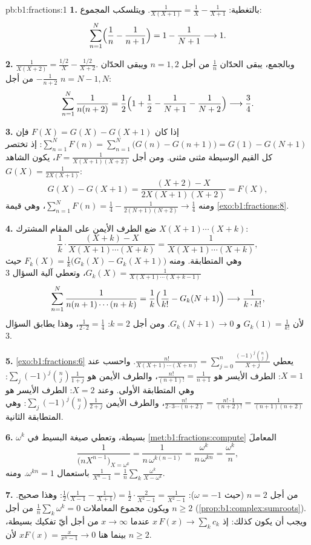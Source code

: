\begin{solution}{pb:b1:fractions:1}
\textbf{1.} بالتغطية: $\frac1{X(X+1)} = \frac1X - \frac1{X+1}$.
ويتلسكب المجموع:
\[
\sum_{n=1}^{N}\Bigl(\frac1n - \frac1{n+1}\Bigr)
= 1 - \frac1{N+1} \longrightarrow 1 .
\]

\textbf{2.} $\frac1{X(X+2)} = \frac{1/2}X - \frac{1/2}{X+2}$.
وبالجمع، يبقى الحدّان $\frac1n$ من أجل $n = 1, 2$ ويبقى الحدّان
$-\frac1{n+2}$ من أجل $n = N-1, N$:
\[
\sum_{n=1}^{N}\frac1{n(n+2)}
= \frac12\Bigl(1 + \frac12 - \frac1{N+1} - \frac1{N+2}\Bigr)
\longrightarrow \frac34 .
\]

\textbf{3.} إذا كان $F(X) = G(X) - G(X+1)$ فإن $\sum_{n=1}^N F(n) =
\sum_{n=1}^N\bigl(G(n) - G(n+1)\bigr) = G(1) - G(N+1)$: إذ تختصر
كل القيم الوسيطة مثنى مثنى. ومن أجل $F =
\frac1{X(X+1)(X+2)}$، يكون الشاهد $G(X) = \frac1{2X(X+1)}$:
\[
G(X) - G(X+1)
= \frac{(X+2) - X}{2X(X+1)(X+2)} = F(X) ,
\]
ومنه $\sum_{n=1}^N F(n) = \frac14 - \frac1{2(N+1)(N+2)} \to
\frac14$، وهي قيمة \cref{exo:b1:fractions:8}.

\textbf{4.} ضع الطرف الأيمن على المقام المشترك
$X(X+1)\cdots(X+k)$:
\[
\frac1k\cdot\frac{(X + k) - X}{X(X+1)\cdots(X+k)}
= \frac{1}{X(X+1)\cdots(X+k)} ,
\]
وهي المتطابقة. ومنه $F_k(X) = \frac1k\bigl(G_k(X) -
G_k(X+1)\bigr)$ حيث $G_k(X) = \frac1{X(X+1)\cdots(X+k-1)}$، وتعطي
آلية السؤال 3
\[
\sum_{n=1}^{N}\frac1{n(n+1)\cdots(n+k)}
= \frac1k\Bigl(\frac1{k!} - G_k(N+1)\Bigr)
\longrightarrow \frac1{k\cdot k!} ,
\]
لأن $G_k(1) = \frac1{k!}$ و $G_k(N+1) \to 0$. ومن أجل $k = 2$:
$\frac1{2\cdot2} = \frac14$، وهذا يطابق السؤال 3.

\textbf{5.} \cref{exo:b1:fractions:6} يعطي
$\frac{n!}{X(X+1)\cdots(X+n)} = \sum_{j=0}^n
\frac{(-1)^j\binom nj}{X + j}$. واحسب عند $X = 1$: الطرف الأيسر
هو $\frac{n!}{(n+1)!} = \frac1{n+1}$، والطرف الأيمن هو
$\sum_j(-1)^j\binom nj\frac1{1+j}$: وهي المتطابقة الأولى. وعند $X = 2$:
الطرف الأيسر هو $\frac{n!}{2\cdot3\cdots(n+2)} =
\frac{n!\cdot1}{(n+2)!} = \frac1{(n+1)(n+2)}$، والطرف الأيمن
$\sum_j(-1)^j\binom nj\frac1{2+j}$: وهي المتطابقة الثانية.

\textbf{6.}  $\omega^k$ بسيطة، وتعطي صيغة 
البسيط في \cref{met:b1:fractions:compute} المعاملَ
\[
\frac{1}{\bigl(nX^{n-1}\bigr)_{X = \omega^k}}
= \frac{1}{n\,\omega^{k(n-1)}}
= \frac{\omega^k}{n\,\omega^{kn}} = \frac{\omega^k}n ,
\]
باستعمال $\omega^{kn} = 1$. ومنه $\frac1{X^n-1} = \frac1n\sum_k
\frac{\omega^k}{X - \omega^k}$.

\textbf{7.} من أجل $n = 2$ (حيث $\omega = -1$): $\frac12\bigl(
\frac1{X-1} - \frac1{X+1}\bigr) = \frac12\cdot\frac{2}{X^2-1} =
\frac1{X^2-1}$: وهذا صحيح. ويكون مجموع المعاملات
$\frac1n\sum_k\omega^k = 0$ من أجل $n \geq 2$
(\cref{prop:b1:complex:sumroots}). ويجب أن يكون كذلك: إذ $x\,F(x) \to
\sum_k c_k$ عندما $x \to \infty$ من أجل أيّ تفكيك 
بسيطة، بينما هنا $xF(x) = \frac{x}{x^n-1} \to 0$ لأن $n \geq
2$.


\end{solution}
